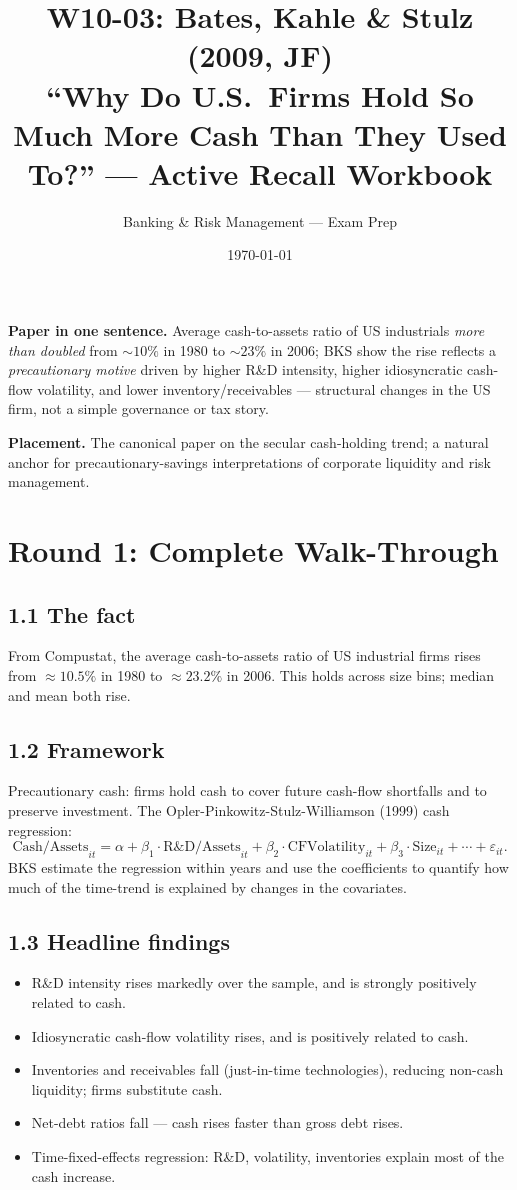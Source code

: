 \documentclass[11pt]{article}
\title{W10-03: Bates, Kahle \& Stulz (2009, JF) \\
\large ``Why Do U.S.\ Firms Hold So Much More Cash Than They Used To?'' --- Active Recall Workbook}
\author{Banking \& Risk Management --- Exam Prep}
\date{\today}
\begin{document}
\maketitle

\begin{keybox}
\textbf{Paper in one sentence.} Average cash-to-assets ratio of US industrials \emph{more than doubled} from $\sim 10\%$ in 1980 to $\sim 23\%$ in 2006; BKS show the rise reflects a \emph{precautionary motive} driven by higher R\&D intensity, higher idiosyncratic cash-flow volatility, and lower inventory/receivables --- structural changes in the US firm, not a simple governance or tax story.

\textbf{Placement.} The canonical paper on the secular cash-holding trend; a natural anchor for precautionary-savings interpretations of corporate liquidity and risk management.
\end{keybox}

\section*{Round 1: Complete Walk-Through}

\subsection*{1.1 The fact}
From Compustat, the average cash-to-assets ratio of US industrial firms rises from $\approx 10.5\%$ in 1980 to $\approx 23.2\%$ in 2006. This holds across size bins; median and mean both rise.

\subsection*{1.2 Framework}
Precautionary cash: firms hold cash to cover future cash-flow shortfalls and to preserve investment. The Opler-Pinkowitz-Stulz-Williamson (1999) cash regression:
\[
\text{Cash/Assets}_{it}=\alpha + \beta_1\cdot\text{R\&D/Assets}_{it} + \beta_2\cdot\text{CFVolatility}_{it} + \beta_3\cdot\text{Size}_{it} + \cdots + \varepsilon_{it}.
\]
BKS estimate the regression within years and use the coefficients to quantify how much of the time-trend is explained by changes in the covariates.

\subsection*{1.3 Headline findings}
\begin{itemize}
\item R\&D intensity rises markedly over the sample, and is strongly positively related to cash.
\item Idiosyncratic cash-flow volatility rises, and is positively related to cash.
\item Inventories and receivables fall (just-in-time technologies), reducing non-cash liquidity; firms substitute cash.
\item Net-debt ratios fall --- cash rises faster than gross debt rises.
\item Time-fixed-effects regression: R\&D, volatility, inventories explain most of the cash increase.
\end{itemize}
\end{document}
